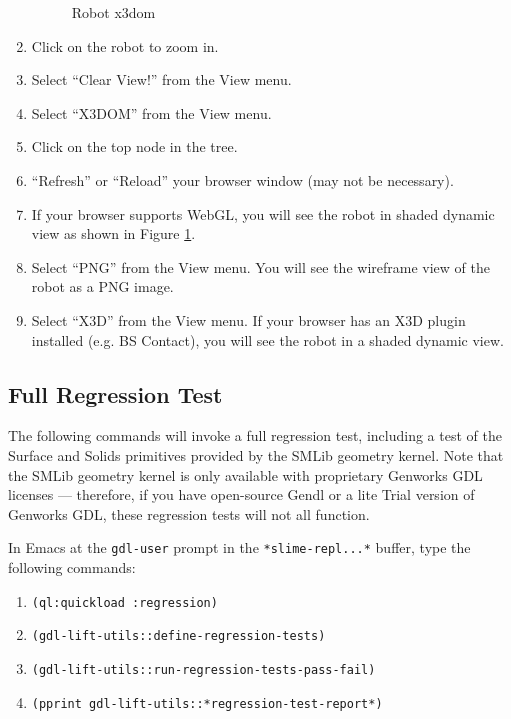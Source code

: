 \documentclass [11pt]{book}
\begin{document}
\begin{enumerate}
\begin{figure}
\caption{Robot x3dom}

\label{fig:tasty-robot-x3dom}

\end{figure}

\item Click on the robot to zoom in.

\item Select ``Clear View!'' from the View menu.

\item Select ``X3DOM'' from the View menu.

\item Click on the top node in the tree.

\item ``Refresh'' or ``Reload'' your browser window (may not be necessary).

\item If your browser supports WebGL, you will see the robot in shaded dynamic view as shown in Figure
\ref{fig:tasty-robot-x3dom}.

\item Select ``PNG'' from the View menu. You will see the
	 wireframe view of the robot as a PNG image.

\item Select ``X3D'' from the View menu. If your browser
has an X3D plugin installed (e.g. BS Contact), you will see the robot
in a shaded dynamic view.

\end{enumerate}



\subsection{Full Regression Test}

\label{subsec:fullregressiontest}

The following commands will invoke a full regression test,
including a test of the Surface and Solids primitives provided by the
SMLib geometry kernel. Note that the SMLib geometry kernel is only
available with proprietary Genworks GDL licenses --- therefore, if you
have open-source Gendl or a lite Trial version of Genworks GDL, these
regression tests will not all function.

In Emacs at the \texttt{gdl-user} prompt in the \texttt{*slime-repl...*} buffer, type the following commands:

\begin{enumerate}

\item \texttt{(ql:quickload :regression)}

\item \texttt{(gdl-lift-utils::define-regression-tests)}

\item \texttt{(gdl-lift-utils::run-regression-tests-pass-fail)}

\item \texttt{(pprint gdl-lift-utils::*regression-test-report*)}

\end{enumerate}
\end{document}
